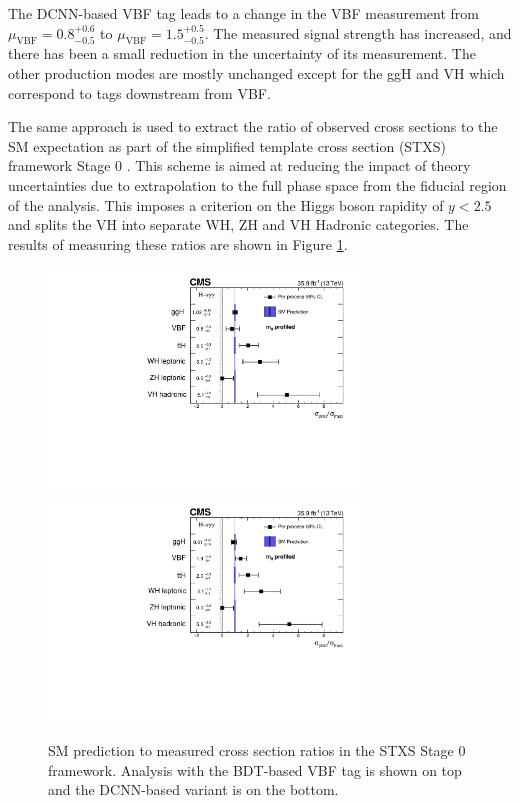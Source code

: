 The DCNN-based VBF tag leads to a change in the VBF measurement from $\mu_{\mathrm{VBF}}=0.8^{+0.6}_{-0.5}$ to $\mu_{\mathrm{VBF}}=1.5^{+0.5}_{-0.5}$.
The measured signal strength has increased, and there has been a small reduction in the uncertainty of its measurement.
The other production modes are mostly unchanged except for the ggH and VH which correspond to tags downstream from VBF.


The same approach is used to extract the ratio of observed cross sections to the SM expectation as part of the simplified template cross section (STXS) framework Stage 0 \cite{LHCHXS}.
This scheme is aimed at reducing the impact of theory uncertainties due to extrapolation to the full phase space from the fiducial region of the analysis. 
This imposes a criterion on the Higgs boson rapidity of $y<2.5$ and splits the VH into separate WH, ZH and VH Hadronic categories. 
The results of measuring these ratios are shown in Figure \ref{fig:stats_results:stxs}.
\begin{figure}[h!]
    \begin{center}
        \includegraphics[width=0.75\textwidth]{figures/stats_results/CMS-HIG-16-040_Figure_018.pdf}
        \includegraphics[width=0.75\textwidth]{figures/stats_results/STXSPerProcessMuProfileMH_ReMap.pdf}
    \end{center}
    \caption{SM prediction to measured cross section ratios in the STXS Stage 0 framework. Analysis with the BDT-based VBF tag is shown on top and the DCNN-based variant is on the bottom.}
        \label{fig:stats_results:stxs}
\end{figure}

